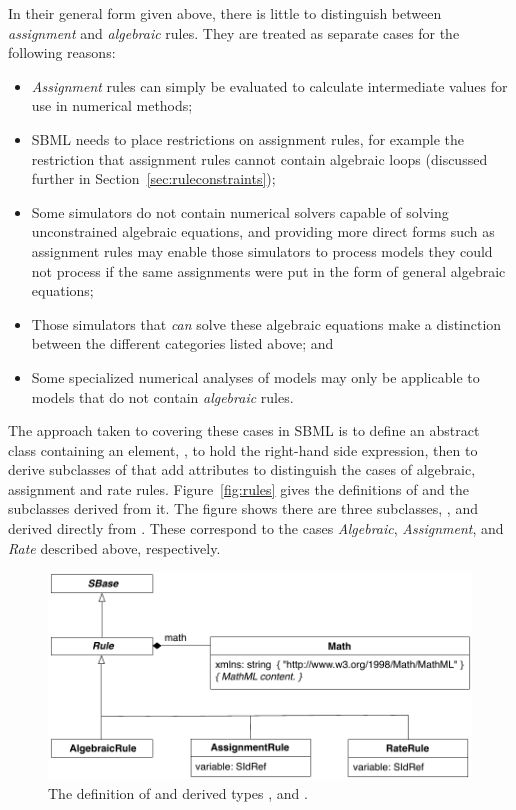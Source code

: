 In their general form given above, there is little to distinguish
between \emph{assignment} and \emph{algebraic} rules.  They are
treated as separate cases for the following reasons:
\begin{itemize}
  
\item \emph{Assignment} rules can simply be evaluated to calculate
  intermediate values for use in numerical methods;
  
\item SBML needs to place restrictions on assignment rules, for
  example the restriction that assignment rules cannot contain
  algebraic loops (discussed further in
  Section~\ref{sec:ruleconstraints});

\item Some simulators do not contain numerical solvers capable of
  solving unconstrained algebraic equations, and providing more
  direct forms such as assignment rules may enable those
  simulators to process models they could not process if the same
  assignments were put in the form of general algebraic equations;
  
\item Those simulators that \emph{can} solve these algebraic
  equations make a distinction between the different categories
  listed above; and
  
\item Some specialized numerical analyses of models may only be
  applicable to models that do not contain \emph{algebraic} rules.

\end{itemize}

The approach taken to covering these cases in SBML is to define an
abstract \Rule class containing an element,
, to hold the right-hand side expression, then to
derive subclasses of \Rule that add attributes to
distinguish the cases of algebraic, assignment and rate rules.
Figure~\vref{fig:rules} gives the definitions of \Rule and the
subclasses derived from it.  The figure shows there are three
subclasses, \AlgebraicRule, \AssignmentRule and \RateRule derived
directly from \Rule. These correspond to the cases
\emph{Algebraic}, \emph{Assignment}, and \emph{Rate} described
above, respectively.

\begin{figure}[htb]
  \centering
  \includegraphics[scale=0.8]{figs/rule-uml}
  \caption{The definition of \Rule and derived types
      \AlgebraicRule, \AssignmentRule and \RateRule.}
  \label{fig:rules}
\end{figure}



